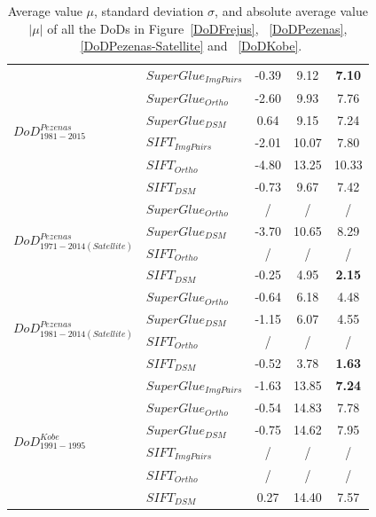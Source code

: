 \begin{table}
\begin{tabular}{||l|l|c|c|c||}
\multirow{6}{*}{$DoD^{Pezenas}_{1981-2015}$}
&${SuperGlue_{ImgPairs}}$ & -0.39 & 9.12 & \textbf{7.10}\\
&${SuperGlue_{Ortho}}$ & -2.60 & 9.93 & 7.76\\
&${SuperGlue_{DSM}}$ & 0.64 & 9.15 & 7.24\\
&${SIFT_{ImgPairs}}$ & -2.01 & 10.07 & 7.80\\
&${SIFT_{Ortho}}$ & -4.80 & 13.25 & 10.33\\
&${SIFT_{DSM}}$ & -0.73 & 9.67 & 7.42\\\hline

\multirow{4}{*}{$DoD^{Pezenas}_{1971-2014(Satellite)}$}
&${SuperGlue_{Ortho}}$ & / & / & /\\
&${SuperGlue_{DSM}}$ & -3.70 & 10.65 & 8.29\\
&${SIFT_{Ortho}}$ & / & / & /\\
&${SIFT_{DSM}}$ & -0.25 & 4.95 & \textbf{2.15}\\\hline

\multirow{4}{*}{$DoD^{Pezenas}_{1981-2014(Satellite)}$}
&${SuperGlue_{Ortho}}$ & -0.64 & 6.18 & 4.48\\
&${SuperGlue_{DSM}}$ & -1.15 & 6.07 & 4.55\\
&${SIFT_{Ortho}}$ & / & / & /\\
&${SIFT_{DSM}}$ & -0.52 & 3.78 & \textbf{1.63} \\\hline


\multirow{6}{*}{$DoD^{Kobe}_{1991-1995}$}
&${SuperGlue_{ImgPairs}}$ & -1.63 & 13.85 & \textbf{7.24}\\
&${SuperGlue_{Ortho}}$ & -0.54 & 14.83 & 7.78\\
&${SuperGlue_{DSM}}$ & -0.75 & 14.62 & 7.95\\
&${SIFT_{ImgPairs}}$ & / & / & / \\
&${SIFT_{Ortho}}$ & / & / & / \\
&${SIFT_{DSM}}$ & 0.27 & 14.40 & 7.57\\\hline
	
\end{tabular}
\caption{Average value $\mu$, standard deviation $\sigma$, and absolute average value $|\mu|$ of all the \ac{DoD}s in Figure~\ref{DoDFrejus}, ~\ref{DoDPezenas}, ~\ref{DoDPezenas-Satellite} and ~\ref{DoDKobe}.}
\label{DoDStatistic}
\end{table}


